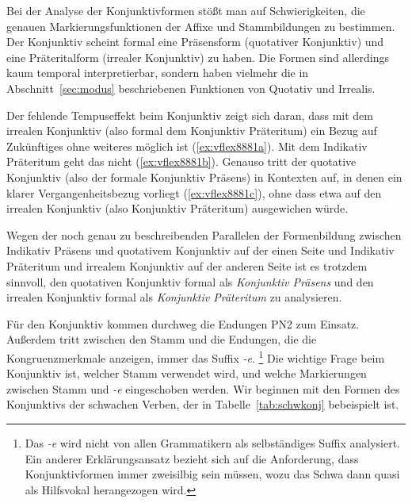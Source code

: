 \label{sec:konjunktivflexion}


Bei der Analyse der Konjunktivformen stößt man auf Schwierigkeiten, die genauen Markierungsfunktionen der Affixe und Stammbildungen zu bestimmen.
Der Konjunktiv scheint formal eine Präsensform (quotativer Konjunktiv) und eine Präteritalform (irrealer Konjunktiv) zu haben.
Die Formen sind allerdings kaum temporal interpretierbar, sondern haben vielmehr die in Abschnitt~\ref{sec:modus} beschriebenen Funktionen von Quotativ und Irrealis.

Der fehlende Tempuseffekt beim Konjunktiv zeigt sich \zB daran, dass mit dem irrealen Konjunktiv (also formal dem Konjunktiv Präteritum) ein Bezug auf Zukünftiges ohne weiteres möglich ist (\ref{ex:vflex8881a}).
Mit dem Indikativ Präteritum geht das nicht (\ref{ex:vflex8881b}).
Genauso tritt der quotative Konjunktiv (also der formale Konjunktiv Präsens) in Kontexten auf, in denen ein klarer Vergangenheitsbezug vorliegt (\ref{ex:vflex8881c}), ohne dass etwa auf den irrealen Konjunktiv (also Konjunktiv Präteritum) ausgewichen würde.

\begin{exe}
  \ex\label{ex:vflex8881}
  \begin{xlist}
  \end{xlist}
\end{exe}

Wegen der noch genau zu beschreibenden Parallelen der Formenbildung zwischen Indikativ Präsens und quotativem Konjunktiv auf der einen Seite und Indikativ Präteritum und irrealem Konjunktiv auf der anderen Seite ist es trotzdem sinnvoll, den quotativen Konjunktiv formal als \textit{Konjunktiv Präsens} und den irrealen Konjunktiv formal als \textit{Konjunktiv Präteritum} zu analysieren.


Für den Konjunktiv kommen durchweg die Endungen PN2 zum Einsatz.
Außerdem tritt zwischen den Stamm und die Endungen, die die Kongruenzmerkmale anzeigen, immer das Suffix \textit{-e}.%
\footnote{Das \textit{-e} wird nicht von allen Grammatikern als selbständiges Suffix analysiert.
Ein anderer Erklärungsansatz bezieht sich auf die Anforderung, dass Konjunktivformen immer zweisilbig sein müssen, wozu das Schwa dann quasi als Hilfsvokal herangezogen wird.}
Die wichtige Frage beim Konjunktiv ist, welcher Stamm verwendet wird, und welche Markierungen zwischen Stamm und \textit{-e} eingeschoben werden.
Wir beginnen mit den Formen des Konjunktivs der schwachen Verben, der in Tabelle~\ref{tab:schwkonj} bebeispielt ist.

